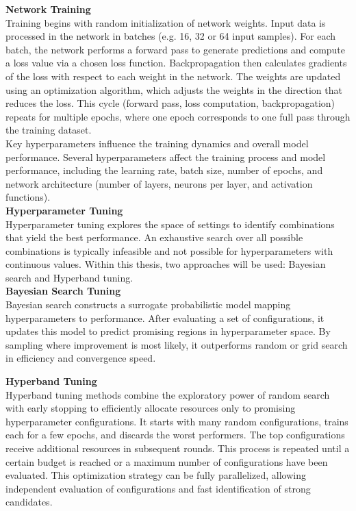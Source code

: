 \textbf{Network Training}\\
Training begins with random initialization of network weights. Input data is processed in the network in batches (e.g. 16, 32 or 64 input samples). For each batch, the network performs a forward pass to generate predictions and compute a loss value via a chosen loss function. Backpropagation then calculates gradients of the loss with respect to each weight in the network. The weights are updated using an optimization algorithm, which adjusts the weights in the direction that reduces the loss. This cycle (forward pass, loss computation, backpropagation) repeats for multiple epochs, where one epoch corresponds to one full pass through the training dataset. \\
Key hyperparameters influence the training dynamics and overall model performance. Several hyperparameters affect the training process and model performance, including the learning rate, batch size, number of epochs, and network architecture (number of layers, neurons per layer, and activation functions).\\

\textbf{Hyperparameter Tuning}\\
Hyperparameter tuning explores the space of settings to identify combinations that yield the best performance. An exhaustive search over all possible combinations is typically infeasible and not possible for hyperparameters with continuous values. Within this thesis, two approaches will be used: Bayesian search and Hyperband tuning.\\

\textbf{Bayesian Search Tuning}\\
Bayesian search constructs a surrogate probabilistic model mapping hyperparameters to performance. After evaluating a set of configurations, it updates this model to predict promising regions in hyperparameter space. By sampling where improvement is most likely, it outperforms random or grid search in efficiency and convergence speed.

\textbf{Hyperband Tuning}\\
Hyperband tuning methods combine the exploratory power of random search with early stopping to efficiently allocate resources only to promising hyperparameter configurations. It starts with many random configurations, trains each for a few epochs, and discards the worst performers. The top configurations receive additional resources in subsequent rounds. This process is repeated until a certain budget is reached or a maximum number of configurations have been evaluated. This optimization strategy can be fully parallelized, allowing independent evaluation of configurations and fast identification of strong candidates. 

